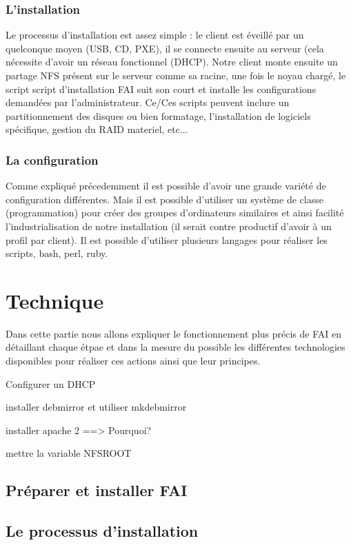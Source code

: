 \documentclass[a4paper,12pt,one side,titlepage]{report}
\begin{document}
\subsection{L'installation}
Le processus d'installation est assez simple : le client est éveillé par un quelconque moyen (USB, CD, PXE), il se connecte ensuite au serveur (cela nécessite d'avoir un réseau fonctionnel (DHCP). Notre client monte ensuite un partage NFS présent sur le serveur comme sa racine, une fois le noyau chargé, le script script d'installation FAI suit son court et installe les configurations demandées par l'administrateur. Ce/Ces scripts peuvent inclure un partitionnement des disques ou bien formatage, l'installation de logiciels spécifique, gestion du RAID materiel, etc...

\subsection{La configuration}
Comme expliqué précedemment il est possible d'avoir une grande variété de configuration différentes. Mais il est possible d'utiliser un système de classe (programmation) pour créer des groupes d'ordinateurs similaires et ainsi facilité l'industrialisation de notre installation (il serait contre productif d'avoir à un profil par client). Il est possible d'utiliser plusieurs langages pour réaliser les scripts, bash, perl, ruby.

\chapter{Technique}
Dans cette partie nous allons expliquer le fonctionnement plus précis de FAI en détaillant chaque étpae et dans la mesure du possible les différentes technologies disponibles pour réaliser ces actions ainsi que leur principes. 


Configurer un DHCP

installer debmirror et utiliser mkdebmirror

installer apache 2 ==> Pourquoi?

mettre la variable NFSROOT


\section{Préparer et installer FAI}


\section{Le processus d'installation}
\end{document}
